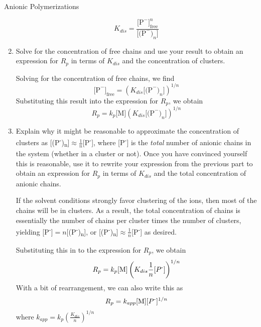\begin{activity}{Anionic Polymerizations}
\begin{exercises}
\begin{enumerate}
				\begin{solution}{}
					\begin{equation*}
						K_{dis} = \frac{\text{[P}^-\text{]}^n_{\text{free}}}{\text{[(P}^-\text{)}_n\text{]}}
					\end{equation*}
				\end{solution}
				
			\item Solve for the concentration of free chains and use your result to obtain an expression for $R_p$ in terms of $K_{dis}$ and the concentration of clusters.
				
				\begin{solution}{}
					Solving for the concentration of free chains, we find
					\begin{equation*}
						\text{[P}^-\text{]}_{\text{free}} = \left(K_{dis}\text{[(P}^-\text{)}_n\text{]}\right)^{1/n}
					\end{equation*}
					Substituting this result into the expression for $R_p$, we obtain
					\begin{equation*}
						R_p = k_p\text{[M]}\left(K_{dis}\text{[(P}^-\text{)}_n\text{]}\right)^{1/n}
					\end{equation*}
				\end{solution}
				
			\item Explain why it might be reasonable to approximate the concentration of clusters as [(P\textsuperscript{-})\textsubscript{n}]$\approx \frac{1}{n}$[P\textsuperscript{-}], where [P\textsuperscript{-}] is the \emph{total} number of anionic chains in the system (whether in a cluster or not).  Once you have convinced yourself this is reasonable, use it to rewrite your expression from the previous part to obtain an expression for $R_p$ in terms of $K_{dis}$ and the total concentration of anionic chains.
				
				\begin{solution}{}
					If the solvent conditions strongly favor clustering of the ions, then most of the chains will be in clusters.  As a result, the total concentration of chains is essentially the number of chains per cluster times the number of clusters, yielding [P\textsuperscript{-}]$=n$[(P\textsuperscript{-})\textsubscript{n}], or [(P\textsuperscript{-})\textsubscript{n}]$\approx \frac{1}{n}$[P\textsuperscript{-}] as desired.
					
					Substituting this in to the expression for $R_p$, we obtain
					\begin{equation*}
						R_p = k_p\text{[M]}\left(K_{dis} \frac{1}{n}[P\textsuperscript{-}]\right)^{1/n}
					\end{equation*}
					With a bit of rearrangement, we can also write this as
					\begin{equation*}
						R_p = k_{app} \text{[M]} [P\textsuperscript{-}]^{1/n}
					\end{equation*}
					where $k_{app} = k_p\left(\frac{K_{dis}}{n}\right)^{1/n}$
				\end{solution}
				

\end{enumerate}
\end{exercises}
\end{activity}
